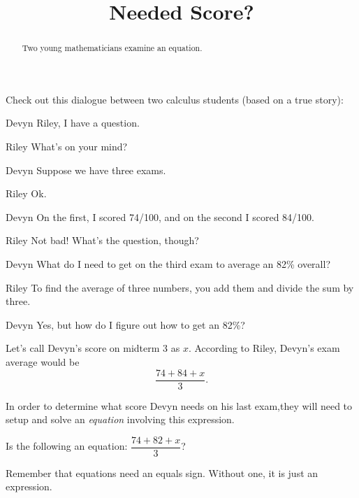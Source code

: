 \documentclass{ximera}
\title[Break-Ground:]{Needed Score?}
\begin{document}
\begin{abstract}
  Two young mathematicians examine an equation.
\end{abstract}
\maketitle

Check out this dialogue between two calculus students (based on a true
story):

\begin{dialogue}
	\item[Devyn] Riley, I have a question.
	\item[Riley] What's on your mind?
	\item[Devyn] Suppose we have three exams.  
	\item[Riley]  Ok. 
	\item[Devyn] On the first, I scored 74/100, and on the second I scored 84/100.
	\item[Riley] Not bad!  What's the question, though?
	\item[Devyn] What do I need to get on the third exam to average an 82\% overall?
	\item[Riley] To find the average of three numbers, you add them and divide the sum by three.
	\item[Devyn] Yes, but how do I figure out how to get an 82\%?
\end{dialogue}

Let's call Devyn's score on midterm 3 as $x$.  According to Riley, Devyn's exam average
would be \[ \frac{74 + 84 + x}{3}. \]

In order to determine what score Devyn needs on his last exam,they will need to setup and solve an \emph{equation} involving this expression.


\begin{problem}
  Is the following an equation: $\displaystyle \dfrac{74 + 82 + x}{3}$?

  \begin{multipleChoice}
  \end{multipleChoice}

  \begin{feedback}
  Remember that equations need an equals sign.  Without one, it is just an expression.  
  \end{feedback}
\end{problem}


%
\end{document}
